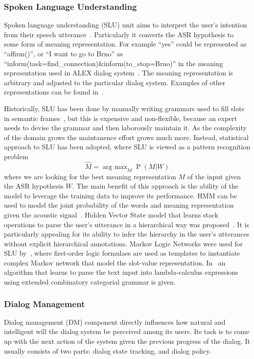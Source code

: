\documentclass[runningheads,a4paper]{llncs}
\begin{document}
\subsubsection{Spoken Language Understanding}
Spoken language understanding (SLU) unit aims to interpret the user's intention from their speech utterance~\cite{wang2005spoken}. Particularly it converts the ASR hypothesis to some form of meaning representation. For example ``yes'' could be represented as ``affirm()'', or ``I want to go to Brno'' as ``inform(task=find\_connection)\&inform(to\_stop=Brno)'' in the meaning representation used in ALEX dialog system~\cite{duvsek2014alex}. The meaning representation is arbitrary and adjusted to the particular dialog system. Examples of other representations can be found in~\cite{skantze2008galatea,he2003data}.

Historically, SLU has been done by manually writing grammars used to fill slots in semantic frames~\cite{ward1994recent,dowding1993gemini}, but this is expensive and non-flexible, because an expert needs to devise the grammar and then laborously maintain it. As the complexity of the domain grows the maintanence effort grows much more. Instead, statistical approach to SLU has been adopted, where SLU is viewed as a pattern recognition problem
\begin{equation}\hat M=\operatorname{arg~max}_M \operatorname{P}(M|W)\end{equation}
where we are looking for the best meaning representation $M$ of the input given the ASR hypothesis $W$. The main benefit of this approach is the ability of the model to leverage the training data to improve its performance. HMM can be used to model the joint probability of the words and meaning representation given the acoustic signal~\cite{pieraccini1992progress,pieraccini1992stochastic}. Hidden Vector State model that learns stack operations to parse the user's utterance in a hierarchical way was proposed~\cite{he2003data}. It is particularly appealing for its ability to infer the hierarchy in the user's utterances without explicit hierarchical annotations. Markov Logic Networks were used for SLU by~\cite{meza2008spoken}, where first-order logic formulaes are used as templates to instantiate complex Markov network that model the slot-value representation. In~\cite{zettlemoyer2007online} an algorithm that learns to parse the text input into lambda-calculus expressions using extended combinatory categorial grammar is given.

\subsubsection{Dialog Management}
Dialog management (DM) component directly influences how natural and intelligent will the dialog system be perceived among its users. Its task is to come up with the next action of the system given the previous progress of the dialog. It usually consists of two parts: dialog state tracking, and dialog policy.
\end{document}
